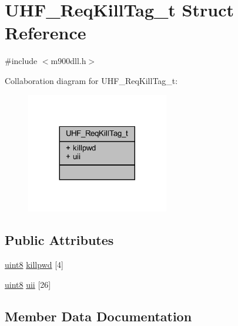 \hypertarget{struct_u_h_f___req_kill_tag__t}{}\section{U\+H\+F\+\_\+\+Req\+Kill\+Tag\+\_\+t Struct Reference}
\label{struct_u_h_f___req_kill_tag__t}


{\ttfamily \#include $<$m900dll.\+h$>$}



Collaboration diagram for U\+H\+F\+\_\+\+Req\+Kill\+Tag\+\_\+t\+:
\nopagebreak
\begin{figure}[H]
\begin{center}
\leavevmode
\includegraphics[width=176pt]{struct_u_h_f___req_kill_tag__t__coll__graph}
\end{center}
\end{figure}
\subsection*{Public Attributes}
\begin{DoxyCompactItemize}
\item 
\mbox{\hyperlink{m900dll_8h_adde6aaee8457bee49c2a92621fe22b79}{uint8}} \mbox{\hyperlink{struct_u_h_f___req_kill_tag__t_aefa721672d2f1a2f5b58b49c69300503}{killpwd}} \mbox{[}4\mbox{]}
\item 
\mbox{\hyperlink{m900dll_8h_adde6aaee8457bee49c2a92621fe22b79}{uint8}} \mbox{\hyperlink{struct_u_h_f___req_kill_tag__t_aca9f65bc530545e42fc892c181123ada}{uii}} \mbox{[}26\mbox{]}
\end{DoxyCompactItemize}


\subsection{Member Data Documentation}
\mbox{\label{struct_u_h_f___req_kill_tag__t_aefa721672d2f1a2f5b58b49c69300503}} 
